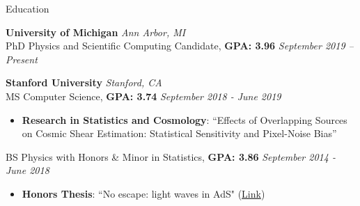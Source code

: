 \documentclass{resume} %
\begin{document}
\begin{rSection}{Education}

{\bf University of Michigan} \hfill {\em Ann Arbor, MI} 
\\ PhD Physics and Scientific Computing Candidate, \textbf{GPA: 3.96} \hfill {\em September 2019 -- Present}
\vspace*{-0.1cm}
%

{\bf Stanford University} \hfill {\em Stanford, CA} 
\\ MS Computer Science, \textbf{GPA: 3.74} \hfill {\em September 2018 - June 2019}

\vspace*{-0.1cm}
%
\begin{itemize}[itemsep=-0.3em] %

    \item 
    \textbf{Research in Statistics and Cosmology}: ``Effects of Overlapping Sources on Cosmic Shear Estimation:  Statistical Sensitivity and Pixel-Noise Bias''
\end{itemize}

%
BS Physics with Honors \& Minor in Statistics, \textbf{GPA: 3.86} \hfill {\em September 2014 - June 2018}
%
\vspace*{-0.1cm}
\begin{itemize}[itemsep=-0.25em] 

    \item 
    \textbf{Honors Thesis}: ``No escape: light waves in AdS" (\href{https://purl.stanford.edu/vf208qp2190}{Link})

\end{itemize}
%
\vspace*{-0.1cm}
\end{rSection}

\end{document}
